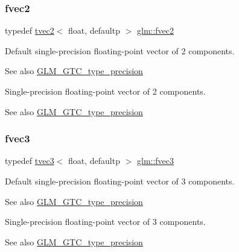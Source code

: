 \subsubsection{\texorpdfstring{fvec2}{fvec2}}
{\footnotesize\ttfamily typedef \hyperlink{structglm_1_1tvec2}{tvec2}$<$ float, defaultp $>$ \hyperlink{group__gtc__type__precision_ga83fb34639f810d0c9240cf7ff0180e20}{glm\+::fvec2}}

Default single-\/precision floating-\/point vector of 2 components. \begin{DoxySeeAlso}{See also}
\hyperlink{group__gtc__type__precision}{G\+L\+M\+\_\+\+G\+T\+C\+\_\+type\+\_\+precision}
\end{DoxySeeAlso}
Single-\/precision floating-\/point vector of 2 components. \begin{DoxySeeAlso}{See also}
\hyperlink{group__gtc__type__precision}{G\+L\+M\+\_\+\+G\+T\+C\+\_\+type\+\_\+precision} 
\end{DoxySeeAlso}
\mbox{\label{group__gtc__type__precision_ga8480fdaa7fb8e177e57b367be79863d8}} 
\subsubsection{\texorpdfstring{fvec3}{fvec3}}
{\footnotesize\ttfamily typedef \hyperlink{structglm_1_1tvec3}{tvec3}$<$ float, defaultp $>$ \hyperlink{group__gtc__type__precision_ga8480fdaa7fb8e177e57b367be79863d8}{glm\+::fvec3}}

Default single-\/precision floating-\/point vector of 3 components. \begin{DoxySeeAlso}{See also}
\hyperlink{group__gtc__type__precision}{G\+L\+M\+\_\+\+G\+T\+C\+\_\+type\+\_\+precision}
\end{DoxySeeAlso}
Single-\/precision floating-\/point vector of 3 components. \begin{DoxySeeAlso}{See also}
\hyperlink{group__gtc__type__precision}{G\+L\+M\+\_\+\+G\+T\+C\+\_\+type\+\_\+precision} 
\end{DoxySeeAlso}
\mbox{\label{group__gtc__type__precision_ga396c4084cd7e5465f8b56035e0420c3e}} 
